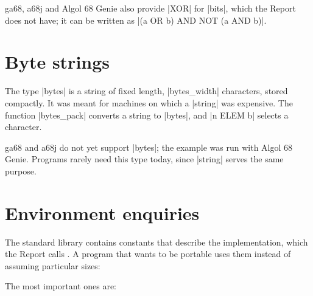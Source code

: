 \begin{implnote}
ga68, a68j and Algol 68 Genie also provide \code|XOR| for \code|bits|,
which the Report does not have; it can be written as
\code|(a OR b) AND NOT (a AND b)|.
\end{implnote}

\section{Byte strings}\label{sec-bytes}

The type \code|bytes| is a string of fixed length, \code|bytes_width|
characters, stored compactly. It was meant for machines on which a
\code|string| was expensive. The function \code|bytes_pack| converts a
string to \code|bytes|, and \code|n ELEM b| selects a character.


\begin{implnote}
ga68 and a68j do not yet support \code|bytes|; the example was run with
Algol 68 Genie. Programs rarely need this type today, since \code|string|
serves the same purpose.
\end{implnote}

\section{Environment enquiries}\label{sec-enquiries}

The standard library contains constants that describe the implementation,
which the Report calls . A program that wants to
be portable uses them instead of assuming particular sizes:


The most important ones are:

